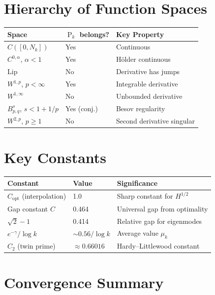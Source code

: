 ﻿\documentclass[12pt,a4paper]{report}
\theoremstyle{plain}
\theoremstyle{definition}
\DeclareMathOperator{\Pk}{P}
\begin{document}
\section{Hierarchy of Function Spaces}

\begin{center}
\begin{tabular}{lll}
\toprule
\textbf{Space} & \textbf{$\Pk_k$ belongs?} & \textbf{Key Property} \\
\midrule
$C([0,N_k])$ & Yes & Continuous \\
$C^{0,\alpha}$, $\alpha < 1$ & Yes & H\"older continuous \\
$\text{Lip}$ & No & Derivative has jumps \\
$W^{1,p}$, $p < \infty$ & Yes & Integrable derivative \\
$W^{1,\infty}$ & No & Unbounded derivative \\
$B^s_{p,q}$, $s < 1+1/p$ & Yes (conj.) & Besov regularity \\
$W^{2,p}$, $p \geq 1$ & No & Second derivative singular \\
\bottomrule
\end{tabular}
\end{center}

\section{Key Constants}

\begin{center}
\begin{tabular}{lll}
\toprule
\textbf{Constant} & \textbf{Value} & \textbf{Significance} \\
\midrule
$C_{\text{opt}}$ (interpolation) & 1.0 & Sharp constant for $H^{1/2}$ \\
Gap constant $C$ & 0.464 & Universal gap from optimality \\
$\sqrt{2}-1$ & 0.414 & Relative gap for eigenmodes \\
$e^{-\gamma}/\log k$ & $\sim 0.56/\log k$ & Average value $\mu_k$ \\
$C_2$ (twin prime) & $\approx 0.66016$ & Hardy--Littlewood constant \\
\bottomrule
\end{tabular}
\end{center}

\section{Convergence Summary}
\end{document}
